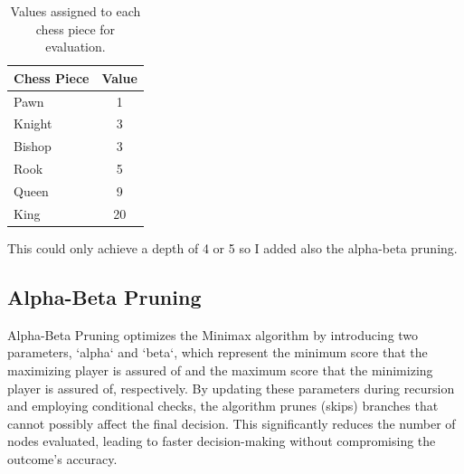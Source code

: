 \documentclass{article}
\begin{document}
\begin{table}[ht]
\centering
\begin{tabular}{|l|c|}
\hline
\textbf{Chess Piece} & \textbf{Value} \\
\hline
Pawn & 1 \\
\hline
Knight & 3 \\
\hline
Bishop & 3 \\
\hline
Rook & 5 \\
\hline
Queen & 9 \\
\hline
King & 20 \\
\hline
\end{tabular}
\caption{Values assigned to each chess piece for evaluation.}
\label{table:chess_piece_values}
\end{table}

This could only achieve a depth of 4 or 5 so I added also the alpha-beta pruning.






















\subsection{Alpha-Beta Pruning}

 Alpha-Beta Pruning optimizes the Minimax algorithm by introducing two parameters, `alpha` and `beta`, which represent the minimum score that the maximizing player is assured of and the maximum score that the minimizing player is assured of, respectively. By updating these parameters during recursion and employing conditional checks, the algorithm prunes (skips) branches that cannot possibly affect the final decision. This significantly reduces the number of nodes evaluated, leading to faster decision-making without compromising the outcome's accuracy.
\end{document}
